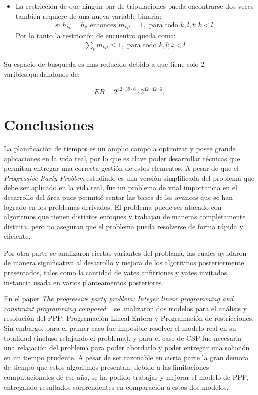 \documentclass[letter, 10pt]{article}
\begin{document}
\begin{itemize}
\begin{itemize}
        \item La restricción de que ningún par de tripulaciones pueda encontrarse dos veces también requiere de una nueva variable binaria:
        \begin{align*}
            \text{si } h_{kt} = h_{lt} \text{ entonces } m_{klt} = 1, \text{ para todo } k,l,t; k<l.
        \end{align*}
        Por lo tanto la restricción de encuentro queda como:
        \begin{align*}
            \sum_{t} m_{klt} \leq 1 ,\text{ para todo } k,l;k<l
        \end{align*}
    \end{itemize}
\end{itemize}

Su espacio de busqueda es mas reducido debido a que tiene solo 2 varibles,quedandonos de:

\begin{align*}
    EB = 2^{42\cdot39\cdot6} \cdot 2^{42\cdot42\cdot6}.
\end{align*}    


\section{Conclusiones}
La planificación de tiempos es un amplio campo a optimizar y posee grande aplicaciones en la vida real, por lo que es clave poder desarrollar técnicas que permitan entregar una correcta gestión de estos elementos. A pesar de que el \textit{Progressive Party Problem} estudiado es una versión simplificada del problema que debe ser aplicado en la vida real, fue un
problema de vital importancia en el desarrollo del área pues permitió sentar las bases de los avances que se han logrado en los problemas derivados. El problema puede ser atacado con algoritmos que tienen distintos enfoques y trabajan
de maneras completamente distinta, pero no aseguran que el problema pueda resolverse de forma rápida y eficiente.

Por otra parte se analizaron ciertas variantes del problema, las cuales ayudaron de manera significativa al desarrollo y mejora de los algoritmos posteriormente presentados, tales como la cantidad de yates anfitriones y yates invitados, instancia usada en varios planteamentos posteriores.

En el paper \textit{The progressive party problem: Integer linear programming and constraint programming compared} ~\cite{Smith1996} se analizaron dos modelos para el análisis y resolución del PPP: Programación Lineal Entera y Programación de restricciones. Sin embargo, para el primer caso fue imposible resolver el modelo real en su totalidad (incluso relajando el problema), y para el caso de CSP fue necesaria una relajación del problema para poder abordarlo y poder entregar una solución en un tiempo prudente. A pesar de ser razonable en cierta parte la gran demora de tiempo que estos algoritmos presentan, debido a las limitaciones computacionales de ese año, se ha podido trabajar y mejorar el modelo de PPP, entregando resultados sorprendentes en comparación a estos dos modelos.
\end{document}
